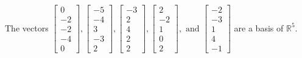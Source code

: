 \begin{exercise}
\begin{exerciseStatement}
  \end{exerciseStatement}
  \begin{exerciseAnswer}
   The vectors \(\left[\begin{array}{r}
0 \\
-2 \\
-2 \\
-4 \\
0
\end{array}\right] , \left[\begin{array}{r}
-5 \\
-4 \\
3 \\
-3 \\
2
\end{array}\right] , \left[\begin{array}{r}
-3 \\
2 \\
4 \\
2 \\
2
\end{array}\right] , \left[\begin{array}{r}
2 \\
-2 \\
1 \\
0 \\
2
\end{array}\right] , \text{ and } \left[\begin{array}{r}
-2 \\
-3 \\
1 \\
4 \\
-1
\end{array}\right]\) 
  	 are  a basis of \(\mathbb{R}^5\).
  


  \end{exerciseAnswer}
\end{exercise}